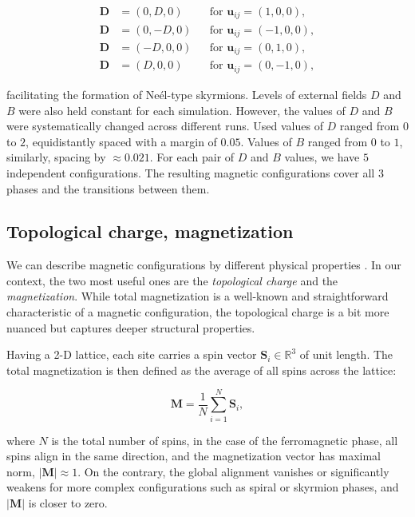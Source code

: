 \begin{align}
	\label{eq:DM-components}
	\bm{D} &= (0, D, 0)  && \text{for } \bm{u}_{ij} = (1, 0, 0), \\
	\bm{D} &= (0, -D, 0)  && \text{for } \bm{u}_{ij} = (-1, 0, 0), \\
	\bm{D} &= (-D, 0, 0) && \text{for } \bm{u}_{ij} = (0, 1, 0), \\
	\bm{D} &= (D, 0, 0) && \text{for } \bm{u}_{ij} = (0, -1, 0),
\end{align}

facilitating the formation of Neél-type skyrmions. Levels of external fields $D$ and $B$ were also held constant for each simulation. However, the values of $D$ and $B$ were systematically changed across different runs. Used values of $D$ ranged from $0$ to $2$, equidistantly spaced with a margin of $0.05$. Values of $B$ ranged from $0$ to $1$, similarly, spacing by $\approx 0.021$. For each pair of $D$ and $B$ values, we have $5$ independent configurations. The resulting magnetic configurations cover all $3$ phases and the transitions between them.

\subsection{Topological charge, magnetization}

We can describe magnetic configurations by different physical properties \cite{li2023magnetic}. In our context, the two most useful ones are the \emph{topological charge} and the \emph{magnetization}. While total magnetization is a well-known and straightforward characteristic of a magnetic configuration, the topological charge is a bit more nuanced but captures deeper structural properties.

Having a 2-D lattice, each site carries a spin vector $\bm{S}_i \in \mathbb{R}^3$ of unit length. The total magnetization is then defined as the average of all spins across the lattice:

\begin{equation}
    \bm{M} = \frac{1}{N} \sum_{i=1}^N \bm{S}_i,
\end{equation}

where $N$ is the total number of spins, in the case of the ferromagnetic phase, all spins align in the same direction, and the magnetization vector has maximal norm, $|\bm{M}| \approx 1$. On the contrary, the global alignment vanishes or significantly weakens for more complex configurations such as spiral or skyrmion phases, and $|\bm{M}|$ is closer to zero.

